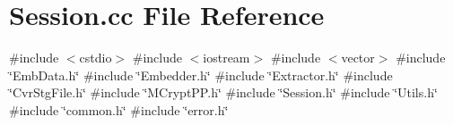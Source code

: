 \section{Session.\+cc File Reference}
\label{Session_8cc}
{\ttfamily \#include $<$cstdio$>$}\newline
{\ttfamily \#include $<$iostream$>$}\newline
{\ttfamily \#include $<$vector$>$}\newline
{\ttfamily \#include \char`\"{}Emb\+Data.\+h\char`\"{}}\newline
{\ttfamily \#include \char`\"{}Embedder.\+h\char`\"{}}\newline
{\ttfamily \#include \char`\"{}Extractor.\+h\char`\"{}}\newline
{\ttfamily \#include \char`\"{}Cvr\+Stg\+File.\+h\char`\"{}}\newline
{\ttfamily \#include \char`\"{}M\+Crypt\+P\+P.\+h\char`\"{}}\newline
{\ttfamily \#include \char`\"{}Session.\+h\char`\"{}}\newline
{\ttfamily \#include \char`\"{}Utils.\+h\char`\"{}}\newline
{\ttfamily \#include \char`\"{}common.\+h\char`\"{}}\newline
{\ttfamily \#include \char`\"{}error.\+h\char`\"{}}\newline
